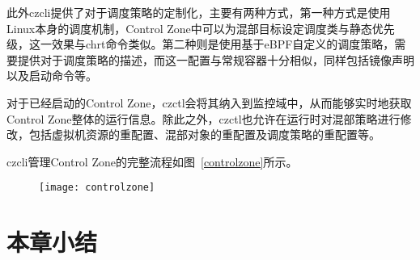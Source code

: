 此外czcli提供了对于调度策略的定制化，主要有两种方式，第一种方式是使用Linux本身的调度机制，Control Zone中可以为混部目标设定调度类与静态优先级，这一效果与chrt命令类似。第二种则是使用基于eBPF自定义的调度策略，需要提供对于调度策略的描述，而这一配置与常规容器十分相似，同样包括镜像声明以及启动命令等。

对于已经启动的Control Zone，czctl会将其纳入到监控域中，从而能够实时地获取Control Zone整体的运行信息。除此之外，czctl也允许在运行时对混部策略进行修改，包括虚拟机资源的重配置、混部对象的重配置及调度策略的重配置等。

czcli管理Control Zone的完整流程如图~\ref{controlzone}所示。

\begin{figure}[!htbp]
    \centering
    \texttt{[image: controlzone]}
    \label{fig:controlzone}
\end{figure}

\section{本章小结}
